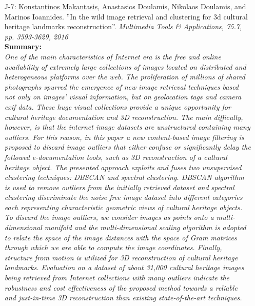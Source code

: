 \documentclass[a4paper,10pt]{article}
\begin{document}
\begin{itemize}
	\item [J-7:]\underline{Konstantinos Makantasis}, Anastasios Doulamis, Nikolaos Doulamis, and Marinos Ioannides. ''In the wild image retrieval and clustering for 3d cultural heritage landmarks reconstruction''. \textit{Multimedia Tools \& Applications, 75.7, pp. 3593-3629, 2016}\\
	\textbf{Summary:}\\
	\textit{One of the main characteristics of Internet era is the free and online availability of extremely large collections of images located on distributed and heterogeneous platforms over the web. The proliferation of millions of shared photographs spurred the emergence of new image retrieval techniques based not only on images’ visual information, but on geolocation tags and camera exif data. These huge visual collections provide a unique opportunity for cultural heritage documentation and 3D reconstruction. The main difficulty, however, is that the internet image datasets are unstructured containing many outliers. For this reason, in this paper a new content-based image filtering is proposed to discard image outliers that either confuse or significantly delay the followed e-documentation tools, such as 3D reconstruction of a cultural heritage object. The presented approach exploits and fuses two unsupervised clustering techniques: DBSCAN and spectral clustering. DBSCAN algorithm is used to remove outliers from the initially retrieved dataset and spectral clustering discriminate the noise free image dataset into different categories each representing characteristic geometric views of cultural heritage objects. To discard the image outliers, we consider images as points onto a multi-dimensional manifold and the multi-dimensional scaling algorithm is adopted to relate the space of the image distances with the space of Gram matrices through which we are able to compute the image coordinates. Finally, structure from motion is utilized for 3D reconstruction of cultural heritage landmarks. Evaluation on a dataset of about 31,000 cultural heritage images being retrieved from Internet collections with many outliers indicate the robustness and cost effectiveness of the proposed method towards a reliable and just-in-time 3D reconstruction than existing state-of-the-art techniques.}
	

\end{itemize}
\end{document}
